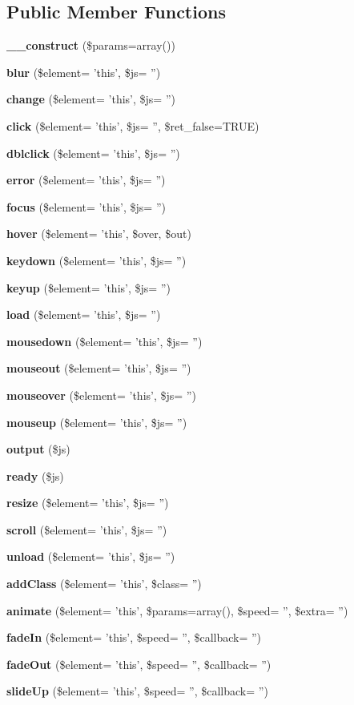 \subsection*{Public Member Functions}
\begin{DoxyCompactItemize}
\item 
{\bf \-\_\-\-\_\-construct} (\$params=array())
\item 
{\bf blur} (\$element= 'this', \$js= '')
\item 
{\bf change} (\$element= 'this', \$js= '')
\item 
{\bf click} (\$element= 'this', \$js= '', \$ret\-\_\-false=T\-R\-U\-E)
\item 
{\bf dblclick} (\$element= 'this', \$js= '')
\item 
{\bf error} (\$element= 'this', \$js= '')
\item 
{\bf focus} (\$element= 'this', \$js= '')
\item 
{\bf hover} (\$element= 'this', \$over, \$out)
\item 
{\bf keydown} (\$element= 'this', \$js= '')
\item 
{\bf keyup} (\$element= 'this', \$js= '')
\item 
{\bf load} (\$element= 'this', \$js= '')
\item 
{\bf mousedown} (\$element= 'this', \$js= '')
\item 
{\bf mouseout} (\$element= 'this', \$js= '')
\item 
{\bf mouseover} (\$element= 'this', \$js= '')
\item 
{\bf mouseup} (\$element= 'this', \$js= '')
\item 
{\bf output} (\$js)
\item 
{\bf ready} (\$js)
\item 
{\bf resize} (\$element= 'this', \$js= '')
\item 
{\bf scroll} (\$element= 'this', \$js= '')
\item 
{\bf unload} (\$element= 'this', \$js= '')
\item 
{\bf add\-Class} (\$element= 'this', \$class= '')
\item 
{\bf animate} (\$element= 'this', \$params=array(), \$speed= '', \$extra= '')
\item 
{\bf fade\-In} (\$element= 'this', \$speed= '', \$callback= '')
\item 
{\bf fade\-Out} (\$element= 'this', \$speed= '', \$callback= '')
\item 
{\bf slide\-Up} (\$element= 'this', \$speed= '', \$callback= '')

\end{DoxyCompactItemize}
